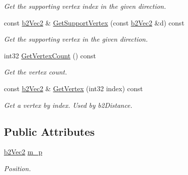 \begin{DoxyCompactItemize}
\begin{DoxyCompactList}\small\item\em Get the supporting vertex index in the given direction. \end{DoxyCompactList}\item 
const \hyperlink{structb2_vec2}{b2\+Vec2} \& \hyperlink{classb2_circle_shape_aa23975b480495bf8bc70073d4f135fd2}{Get\+Support\+Vertex} (const \hyperlink{structb2_vec2}{b2\+Vec2} \&d) const \hypertarget{classb2_circle_shape_aa23975b480495bf8bc70073d4f135fd2}{}\label{classb2_circle_shape_aa23975b480495bf8bc70073d4f135fd2}

\begin{DoxyCompactList}\small\item\em Get the supporting vertex in the given direction. \end{DoxyCompactList}\item 
int32 \hyperlink{classb2_circle_shape_a477a087b143147223e4b9fbb6581acf1}{Get\+Vertex\+Count} () const \hypertarget{classb2_circle_shape_a477a087b143147223e4b9fbb6581acf1}{}\label{classb2_circle_shape_a477a087b143147223e4b9fbb6581acf1}

\begin{DoxyCompactList}\small\item\em Get the vertex count. \end{DoxyCompactList}\item 
const \hyperlink{structb2_vec2}{b2\+Vec2} \& \hyperlink{classb2_circle_shape_a029e555a3ea76b00479b051f1b813c3a}{Get\+Vertex} (int32 index) const \hypertarget{classb2_circle_shape_a029e555a3ea76b00479b051f1b813c3a}{}\label{classb2_circle_shape_a029e555a3ea76b00479b051f1b813c3a}

\begin{DoxyCompactList}\small\item\em Get a vertex by index. Used by b2\+Distance. \end{DoxyCompactList}\end{DoxyCompactItemize}
\subsection*{Public Attributes}
\begin{DoxyCompactItemize}
\item 
\hyperlink{structb2_vec2}{b2\+Vec2} \hyperlink{classb2_circle_shape_a190705618b2e65f636f1dc03c63640ff}{m\+\_\+p}\hypertarget{classb2_circle_shape_a190705618b2e65f636f1dc03c63640ff}{}\label{classb2_circle_shape_a190705618b2e65f636f1dc03c63640ff}

\begin{DoxyCompactList}\small\item\em Position. \end{DoxyCompactList}\end{DoxyCompactItemize}
